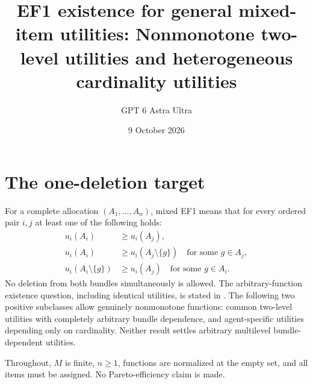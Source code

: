 \documentclass[11pt]{article}
\title{EF1 existence for general mixed-item utilities: Nonmonotone two-level utilities and heterogeneous cardinality utilities}
\author{GPT 6 Astra Ultra}
\date{9 October 2026}
\theoremstyle{definition}
\begin{document}
\maketitle

\section*{The one-deletion target}
For a complete allocation $(A_1,\ldots,A_n)$, mixed EF1 means that for
every ordered pair $i,j$ at least one of the following holds:
\[
 \begin{split}
 u_i(A_i)&\ge u_i(A_j),\\
 u_i(A_i)&\ge u_i(A_j\setminus\{g\})\quad\text{for some }g\in A_j,\\
 u_i(A_i\setminus\{g\})&\ge u_i(A_j)\quad\text{for some }g\in A_i.
 \end{split}                                             \tag{1}
\]
No deletion from both bundles simultaneously is allowed.
The arbitrary-function existence question, including identical utilities,
is stated in \cite[Definition 3.3 and Section 4.1, Open Question 1]{mixed}.
The following two positive subclasses allow genuinely nonmonotone
functions: common two-level utilities with completely arbitrary bundle
dependence, and agent-specific utilities depending only on cardinality.
Neither result settles arbitrary multilevel bundle-dependent utilities.

Throughout, $M$ is finite, $n\ge1$, functions are normalized at the empty
set, and all items must be assigned. No Pareto-efficiency claim is made.
\end{document}

